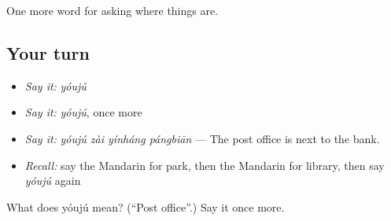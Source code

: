\begin{grammarlens}[title={What you've built}]
One more word for asking where things are.
\end{grammarlens}

\subsection*{Your turn}
\begin{itemize}
\raggedright
  \item \emph{Say it:} \emph{yóujú}
  \item \emph{Say it:} \emph{yóujú}, once more
  \item \emph{Say it:} \emph{yóujú zài yínháng pángbiān} — The post office is next to the bank.
  \item \emph{Recall:} say the Mandarin for park, then the Mandarin for library, then say \emph{yóujú} again
\end{itemize}

\begin{tcolorbox}[breakable,colback=teal!4,colframe=teal!35!black,title={Before you move on}]
What does yóujú mean? (\textquotedblleft{}Post office\textquotedblright{}.) Say it once more.
\end{tcolorbox}

